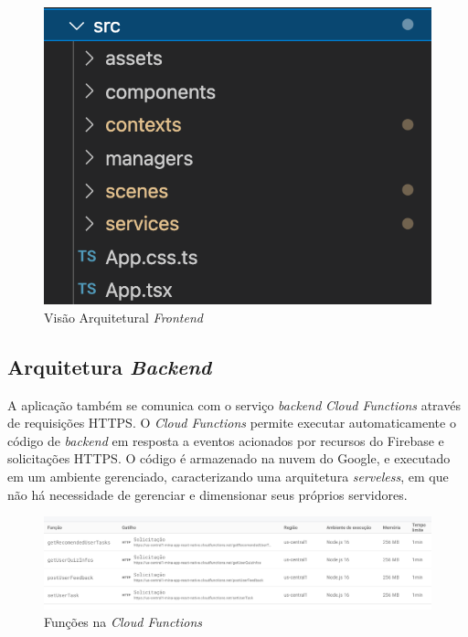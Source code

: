 \begin{figure}[ht]
	\caption{Visão Arquitetural \emph{Frontend}}
	\begin{center}
	\includegraphics[keepaspectratio=true,scale=0.6]{figuras/frontend.png}
	\end{center}
    \label{fig13}
\end{figure}

\subsection{Arquitetura \emph{Backend}}

A aplicação também se comunica com o serviço \emph{backend} \emph{Cloud Functions} através de requisições HTTPS.
O \emph{Cloud Functions} permite executar automaticamente o código de \emph{backend} em resposta a 
eventos acionados por recursos do Firebase e solicitações HTTPS. 
O código é armazenado na nuvem do Google, e executado em um ambiente gerenciado, caracterizando 
uma arquitetura \emph{serveless}, em que não há necessidade de gerenciar e dimensionar seus 
próprios servidores. 

\begin{figure}[ht]
	\caption{Funções na \emph{Cloud Functions}}
	\begin{center}
	\includegraphics[keepaspectratio=true,scale=0.42]{figuras/funcoes.png}
	\end{center}
    \label{fig14}
\end{figure}

